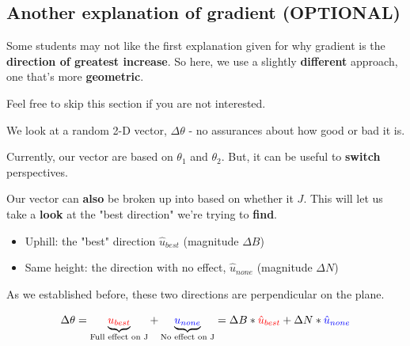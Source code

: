    \subsection{Another explanation of gradient (OPTIONAL)}
    
        Some students may not like the first explanation given for why gradient is the \textbf{direction of greatest increase}. So here, we use a slightly \textbf{different} approach, one that's more \textbf{geometric}. 
        
        Feel free to skip this section if you are not interested.
        
        We look at a random 2-D vector, $\Delta \theta$ - no assurances about how good or bad it is.
        
        Currently, our vector  are based on $\theta_1$ and $\theta_2$. But, it can be useful to \textbf{switch} perspectives.
        
        Our vector can \textbf{also} be broken up into  based on whether it  $J$. This will let us take a \textbf{look} at the "best direction" we're trying to \textbf{find}.
        
        \begin{itemize}
            \item Uphill: the "best" direction $\hat{u}_{best}$ (magnitude $\Delta B$)
            
            \item Same height: the direction with no effect, $\hat{u}_{none}$ (magnitude $\Delta N$)
        \end{itemize}

        As we established before, these two directions are perpendicular on the plane.
        
        \begin{equation}
            \Delta \theta
            =
            \underbrace{
                \textcolor{red}{u_{best}} 
            }_{\text{Full effect on J}} 
            + 
            \underbrace{
                \textcolor{blue}{u_{none}}
            }_{ \text{No effect on J} } 
            =
            \Delta B * \textcolor{red}{ \hat{u}_{best} }
            + 
            \Delta N * \textcolor{blue}{ \hat{u}_{none} }
        \end{equation}
        
